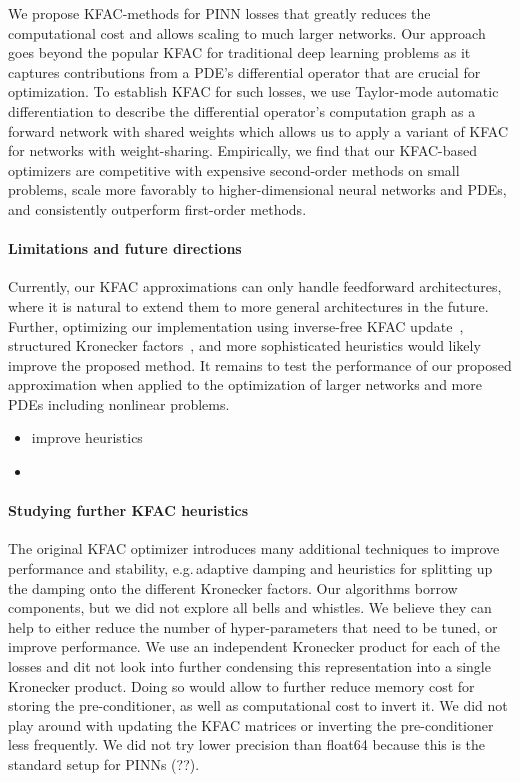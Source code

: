 
We propose KFAC-methods for PINN losses that greatly reduces the computational cost and allows scaling to much larger networks.
Our approach goes beyond the popular KFAC for traditional deep learning problems as it captures contributions from a PDE's differential operator that are crucial for optimization. 
To establish KFAC for such losses, we use Taylor-mode automatic differentiation to describe the differential operator's computation graph as a forward network with shared weights which allows us to apply a variant of KFAC for networks with weight-sharing. 
Empirically, we find that our KFAC-based optimizers are competitive with expensive second-order methods on small problems, scale more favorably to higher-dimensional neural networks and PDEs, and consistently outperform first-order methods.

\paragraph{Limitations and future directions}
Currently, our KFAC approximations can only handle feedforward architectures, where it is natural to extend them to more general architectures in the future. 
Further, optimizing our implementation using inverse-free KFAC update~\citep{lin2023simplifying}, structured Kronecker factors~\citep{lin2023structured}, and more sophisticated heuristics would likely improve the proposed method. 
It remains to test the performance of our proposed approximation when applied to the optimization of larger networks and more PDEs including nonlinear problems. 
\begin{itemize}
    \item improve heuristics
    \item 
\end{itemize}


\paragraph{Studying further KFAC heuristics} The original KFAC optimizer introduces many additional techniques to improve performance and stability, e.g.\,adaptive damping and heuristics for splitting up the damping onto the different Kronecker factors.
Our algorithms borrow components, but we did not explore all bells and whistles.
We believe they can help to either reduce the number of hyper-parameters that need to be tuned, or improve performance.
We use an independent Kronecker product for each of the losses and dit not look into further condensing this representation into a single Kronecker product.
Doing so would allow to further reduce memory cost for storing the pre-conditioner, as well as computational cost to invert it.
We did not play around with updating the KFAC matrices or inverting the pre-conditioner less frequently.
We did not try lower precision than float64 because this is the standard setup for PINNs (??).

